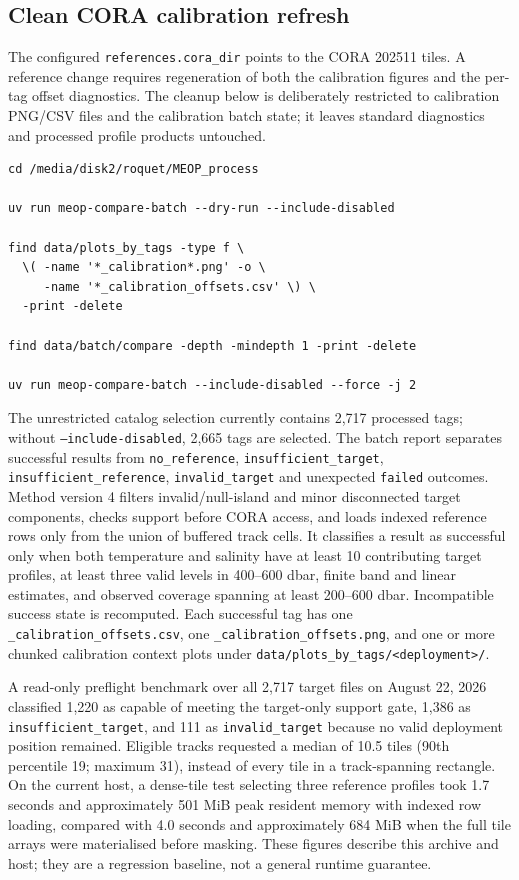 \documentclass[11pt,a4paper]{article}
\newcommand{\pkg}[1]{\texttt{#1}}
\begin{document}
\subsection{Clean CORA calibration refresh}

The configured \pkg{references.cora\_dir} points to the CORA 202511 tiles. A reference
change requires regeneration of both the calibration figures and the per-tag offset
diagnostics. The cleanup below is deliberately restricted to calibration PNG/CSV files
and the calibration batch state; it leaves standard diagnostics and processed profile
products untouched.

\begin{lstlisting}[style=meopcode]
cd /media/disk2/roquet/MEOP_process

uv run meop-compare-batch --dry-run --include-disabled

find data/plots_by_tags -type f \
  \( -name '*_calibration*.png' -o \
     -name '*_calibration_offsets.csv' \) \
  -print -delete

find data/batch/compare -depth -mindepth 1 -print -delete

uv run meop-compare-batch --include-disabled --force -j 2
\end{lstlisting}

The unrestricted catalog selection currently contains 2,717 processed tags; without
\pkg{--include-disabled}, 2,665 tags are selected. The batch report separates successful
results from \pkg{no\_reference}, \pkg{insufficient\_target},
\pkg{insufficient\_reference}, \pkg{invalid\_target} and unexpected \pkg{failed}
outcomes. Method version 4 filters invalid/null-island and minor disconnected target
components, checks support before CORA access, and loads indexed reference rows only
from the union of buffered track cells. It classifies a result as successful only when both temperature and
salinity have at least 10 contributing target profiles, at least three valid levels in
400--600 dbar, finite band and linear estimates, and observed coverage spanning at least
200--600 dbar. Incompatible success state is recomputed. Each successful tag has
one \pkg{\_calibration\_offsets.csv}, one \pkg{\_calibration\_offsets.png}, and one or
more chunked calibration context plots under \pkg{data/plots\_by\_tags/<deployment>/}.

A read-only preflight benchmark over all 2,717 target files on August 22, 2026 classified
1,220 as capable of meeting the target-only support gate, 1,386 as
\pkg{insufficient\_target}, and 111 as \pkg{invalid\_target} because no valid deployment
position remained. Eligible tracks requested a median of 10.5 tiles (90th percentile 19;
maximum 31), instead of every tile in a track-spanning rectangle. On the current host, a
dense-tile test selecting three reference profiles took 1.7 seconds and approximately
501 MiB peak resident memory with indexed row loading, compared with 4.0 seconds and
approximately 684 MiB when the full tile arrays were materialised before masking. These
figures describe this archive and host; they are a regression baseline, not a general
runtime guarantee.
\end{document}
